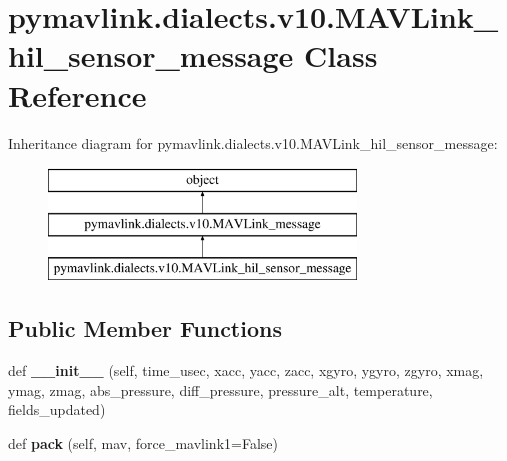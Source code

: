 \hypertarget{classpymavlink_1_1dialects_1_1v10_1_1MAVLink__hil__sensor__message}{}\section{pymavlink.\+dialects.\+v10.\+M\+A\+V\+Link\+\_\+hil\+\_\+sensor\+\_\+message Class Reference}
\label{classpymavlink_1_1dialects_1_1v10_1_1MAVLink__hil__sensor__message}
Inheritance diagram for pymavlink.\+dialects.\+v10.\+M\+A\+V\+Link\+\_\+hil\+\_\+sensor\+\_\+message\+:\begin{figure}[H]
\begin{center}
\leavevmode
\includegraphics[height=3.000000cm]{classpymavlink_1_1dialects_1_1v10_1_1MAVLink__hil__sensor__message}
\end{center}
\end{figure}
\subsection*{Public Member Functions}
\begin{DoxyCompactItemize}
\item 
\mbox{\label{classpymavlink_1_1dialects_1_1v10_1_1MAVLink__hil__sensor__message_a80f9b5c853b7ca52893d17cc7b6e2f62}} 
def {\bfseries \+\_\+\+\_\+init\+\_\+\+\_\+} (self, time\+\_\+usec, xacc, yacc, zacc, xgyro, ygyro, zgyro, xmag, ymag, zmag, abs\+\_\+pressure, diff\+\_\+pressure, pressure\+\_\+alt, temperature, fields\+\_\+updated)
\item 
\mbox{\label{classpymavlink_1_1dialects_1_1v10_1_1MAVLink__hil__sensor__message_af286cef43dc02e0924f880753d4601cc}} 
def {\bfseries pack} (self, mav, force\+\_\+mavlink1=False)
\end{DoxyCompactItemize}
